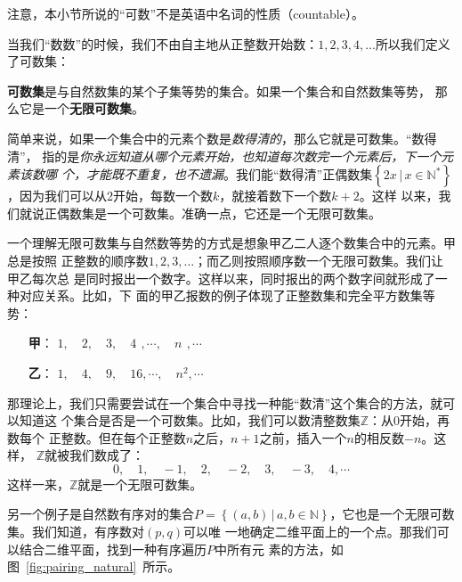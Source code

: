 注意，本小节所说的“可数”不是英语中名词的性质（countable）。

当我们“数数”的时候，我们不由自主地从正整数开始数：$1,2,3,4,\ldots $所以我们定义
了可数集：

\begin{rawdef}[可数集]
    \textbf{可数集}是与自然数集的某个子集等势的集合。如果一个集合和自然数集等势，
    那么它是一个\textbf{无限可数集}。
\end{rawdef}

简单来说，如果一个集合中的元素个数是\emph{数得清的}，那么它就是可数集。“数得清”，
指的是\emph{你永远知道从哪个元素开始，也知道每次数完一个元素后，下一个元素该数哪
个，才能既不重复，也不遗漏}。我们能“数得清”正偶数集$\left\{ 2x\,|\,x\in\mathbb{N}
^\ast\right\} $，因为我们可以从2开始，每数一个数$k$，就接着数下一个数$k+2$。这样
以来，我们就说正偶数集是一个可数集。准确一点，它还是一个无限可数集。

一个理解无限可数集与自然数等势的方式是想象甲乙二人逐个数集合中的元素。甲总是按照
正整数的顺序数$1,2,3,\ldots $；而乙则按照顺序数一个无限可数集。我们让甲乙每次总
是同时报出一个数字。这样以来，同时报出的两个数字间就形成了一种对应关系。比如，下
面的甲乙报数的例子体现了正整数集和完全平方数集等势：

\vspace{2ex}
\begin{minipage}{\textwidth}
    \begin{itemize}
        \item[\textbf{甲}：] $1,\quad 2,\quad 3,\quad 4\,\ , \cdots,\quad n\,\ , \cdots$
        \item[\textbf{乙}：] $1,\quad 4,\quad 9,\quad 16, \cdots,\quad n^2, \cdots$
    \end{itemize}
\end{minipage}
\vspace{2ex}

那理论上，我们只需要尝试在一个集合中寻找一种能“数清”这个集合的方法，就可以知道这
个集合是否是一个可数集。比如，我们可以数清整数集$\mathbb{Z}$：从0开始，再数每个
正整数。但在每个正整数$n$之后，$n+1$之前，插入一个$n$的相反数$-n$。这样，
$\mathbb{Z}$就被我们数成了：
\[
    0,\quad 1,\quad -1,\quad 2,\quad -2,\quad 3,\quad -3,\quad 4,\cdots
\]
这样一来，$\mathbb{Z}$就是一个无限可数集。

另一个例子是自然数有序对的集合$P=\left\{ \left( a,b \right) \,|\, a,b\in\mathbb{N} 
\right\} $，它也是一个无限可数集。我们知道，有序数对$\left( p,q \right) $可以唯
一地确定二维平面上的一个点。那我们可以结合二维平面，找到一种有序遍历$P$中所有元
素的方法，如图~\ref{fig:pairing_natural}~所示。

